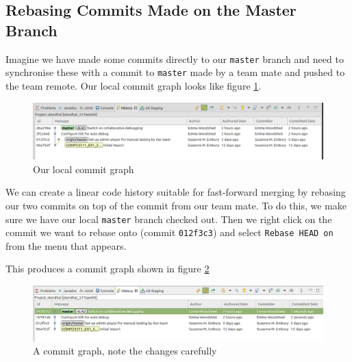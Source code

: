\documentclass[
]{book}
\begin{document}
\hypertarget{rebasingc}{%
\subsection{Rebasing Commits Made on the Master Branch}\label{rebasingc}}

Imagine we have made some commits directly to our \texttt{master} branch and need to synchronise these with a commit to \texttt{master} made by a team mate and pushed to the team remote. Our local commit graph looks like figure \ref{fig:localCommitGraphMasterRebaseExampleBeforeRebaseNoHistory-fig}.

\begin{figure}

{\centering \includegraphics[width=1\linewidth]{images/localCommitGraphMasterRebaseExampleBeforeRebaseNoHistory} 

}

\caption{Our local commit graph}\label{fig:localCommitGraphMasterRebaseExampleBeforeRebaseNoHistory-fig}
\end{figure}

We can create a linear code history suitable for fast-forward merging by rebasing our two commits on top of the commit from our team mate. To do this, we make sure we have our local \texttt{master} branch checked out. Then we right click on the commit we want to rebase onto (commit \texttt{012f3c3}) and select \texttt{Rebase\ HEAD\ on} from the menu that appears.

This produces a commit graph shown in figure \ref{fig:localCommitGraphMasterRebaseExampleAfterRebaseNoHistory-fig}

\begin{figure}

{\centering \includegraphics[width=1\linewidth]{images/localCommitGraphMasterRebaseExampleAfterRebaseNoHistory} 

}

\caption{A commit graph, note the changes carefully}\label{fig:localCommitGraphMasterRebaseExampleAfterRebaseNoHistory-fig}
\end{figure}
\end{document}
